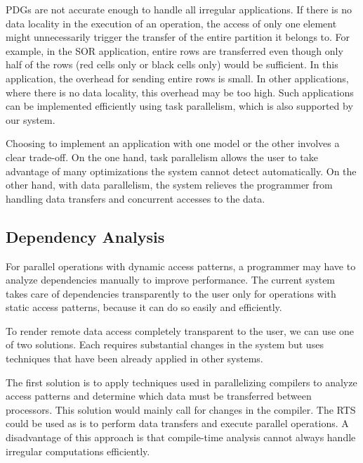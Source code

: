 \documentclass{acmtrans2e}
\begin{document}
PDGs are not accurate enough to handle all irregular applications. If
there is no data locality in the execution of an operation, the access
of only one element might unnecessarily trigger the transfer of the
entire partition it belongs to. For example, in the SOR application,
entire rows are transferred even though only half of the rows (red
cells only or black cells only) would be sufficient. In this
application, the overhead for sending entire rows is small. In other
applications, where there is no data locality, this overhead may be
too high. Such applications can be implemented efficiently using task
parallelism, which is also supported by our system.

Choosing to implement an application with one model or the other
involves a clear trade-off. On the one hand, task parallelism allows
the user to take advantage of many optimizations the system cannot
detect automatically. On the other hand, with data parallelism, the
system relieves the programmer from handling data transfers and
concurrent accesses to the data.

\subsection{Dependency Analysis}

For parallel operations with dynamic access patterns, a programmer may
have to analyze dependencies manually to improve performance.
The current system takes care of dependencies transparently to the
user only for operations with static access patterns, because it can do
so easily and efficiently.

To render remote data access completely transparent to the user, we
can use one of two solutions. Each requires substantial changes in the
system but uses techniques that have been already applied in other
systems.

The first solution is to apply techniques used in parallelizing
compilers to analyze access patterns and determine which data must be
transferred between processors. This solution would mainly call for
changes in the compiler. The RTS could be used as is to perform data
transfers and execute parallel operations. A disadvantage of this
approach is that compile-time analysis cannot always handle irregular
computations efficiently.
\end{document}
